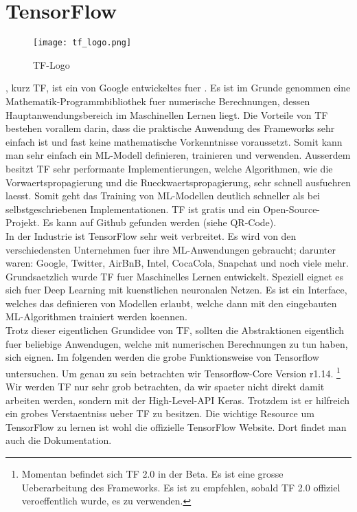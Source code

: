 \section{TensorFlow}
\begin{wrapfigure}{l}{3cm}
  \texttt{[image: tf\_logo.png]}
  \caption{TF-Logo}
\end{wrapfigure}
, kurz TF, ist ein von Google entwickeltes  fuer
. Es ist im Grunde genommen eine
Mathematik-Programmbibliothek fuer numerische Berechnungen, dessen Hauptanwendungsbereich im Maschinellen Lernen
liegt. Die Vorteile von TF bestehen vorallem darin, dass die praktische
Anwendung des Frameworks sehr
einfach ist und fast keine mathematische Vorkenntnisse voraussetzt. Somit kann
man sehr einfach ein ML-Modell definieren, trainieren und verwenden. Ausserdem
besitzt TF sehr performante Implementierungen, welche Algorithmen, wie die
Vorwaertspropagierung und die Rueckwaertspropagierung, sehr schnell ausfuehren
laesst. Somit geht das Training von ML-Modellen deutlich schneller als bei
selbstgeschriebenen Implementationen.
TF ist gratis und ein Open-Source-Projekt. Es kann auf Github gefunden werden
(siehe QR-Code). \\
\para{}
In der Industrie ist TensorFlow sehr weit verbreitet. Es wird von den
verschiedensten Unternehmen fuer ihre ML-Anwendungen gebraucht; darunter waren:
Google, Twitter, AirBnB, Intel, CocaCola, Snapchat und noch viele mehr.
\para{}
Grundsaetzlich wurde TF fuer Maschinelles Lernen entwickelt. Speziell eignet es
sich fuer Deep Learning mit kuenstlichen neuronalen Netzen. Es ist ein
Interface, welches das definieren von Modellen erlaubt, welche dann mit den
eingebauten ML-Algorithmen trainiert werden koennen. \\
Trotz dieser eigentlichen Grundidee von TF, sollten die Abstraktionen eigentlich
fuer beliebige Anwendugen, welche mit numerischen Berechnungen zu tun haben,
sich eignen.
\para{}
Im folgenden werden die grobe Funktionsweise von Tensorflow untersuchen. Um
genau zu sein betrachten wir Tensorflow-Core Version r1.14.
\footnote{Momentan befindet sich TF 2.0 in der Beta. Es ist eine grosse
  Ueberarbeitung des Frameworks. Es ist zu empfehlen, sobald TF 2.0 offiziel
  veroeffentlich wurde, es zu verwenden.}
Wir werden TF nur sehr grob betrachten, da wir spaeter nicht direkt damit
arbeiten werden, sondern mit der High-Level-API Keras. Trotzdem ist er hilfreich
ein grobes Verstaentniss ueber TF zu besitzen.
\para{}
Die wichtige Resource um TensorFlow zu lernen ist wohl die offizielle TensorFlow
Website. Dort findet man auch die Dokumentation.
\para{}

